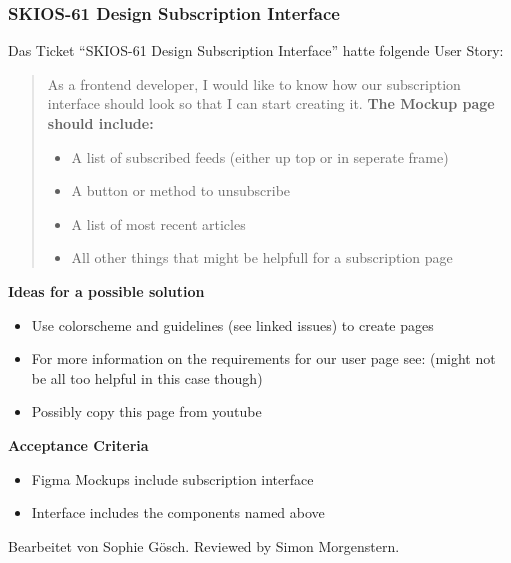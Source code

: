 \subsubsection{SKIOS-61 Design Subscription Interface}
Das Ticket \enquote{SKIOS-61 Design Subscription Interface} hatte folgende User Story:
\begin{quotation}
    As a frontend developer, I would like to know how our subscription interface should look so that I can start creating it.
    \textbf{The Mockup page should include:}
        \begin{itemize}
            \item A list of subscribed feeds (either up top or in seperate frame)
            \item A button or method to unsubscribe
            \item A list of most recent articles
            \item All other things that might be helpfull for a subscription page
        \end{itemize}
\end{quotation}
\textbf{Ideas for a possible solution}
    \begin{itemize}
        \item Use colorscheme and guidelines (see linked issues) to create pages
        \item For more information on the requirements for our user page see:  (might not be all too helpful in this case though)
        \item Possibly copy this page from youtube
    \end{itemize}
\textbf{Acceptance Criteria}
    \begin{itemize}
        \item Figma Mockups include subscription interface
        \item Interface includes the components named above
    \end{itemize}
Bearbeitet von Sophie Gösch.
Reviewed by Simon Morgenstern.

